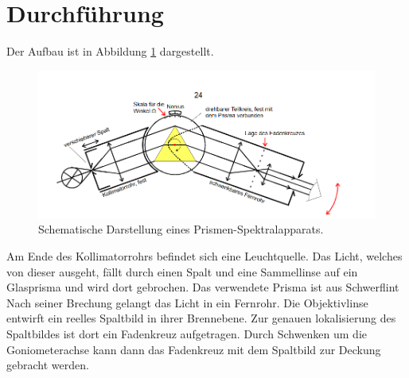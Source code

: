 \section{Durchführung}
\label{sec:Durchführung}
Der Aufbau ist in Abbildung \ref{fig:spek} dargestellt.
\begin{figure}[H]
  \centering
  \includegraphics[width=\textwidth]{content/pris_spek.png}
  \caption{Schematische Darstellung eines Prismen-Spektralapparats\cite{v402}.}
  \label{fig:spek}
\end{figure}
\noindent Am Ende des Kollimatorrohrs befindet sich eine Leuchtquelle.
Das Licht, welches von dieser ausgeht, fällt durch einen Spalt und eine Sammellinse auf ein Glasprisma und wird dort gebrochen.
Das verwendete Prisma ist aus Schwerflint
Nach seiner Brechung gelangt das Licht in ein Fernrohr.
Die Objektivlinse entwirft ein reelles Spaltbild in ihrer Brennebene.
Zur genauen lokalisierung des Spaltbildes ist dort ein Fadenkreuz aufgetragen.
Durch Schwenken um die Goniometerachse kann dann das Fadenkreuz mit dem Spaltbild zur Deckung gebracht werden.

